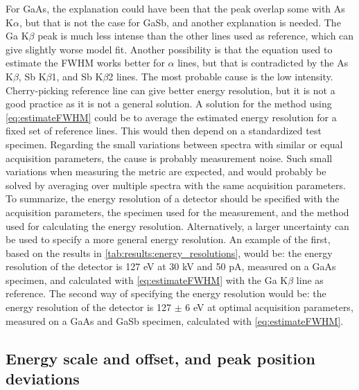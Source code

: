 For GaAs, the explanation could have been that the peak overlap some with As K$\alpha$, but that is not the case for GaSb, and another explanation is needed.
The Ga K$\beta$ peak is much less intense than the other lines used as reference, which can give slightly worse model fit.
Another possibility is that the equation used to estimate the FWHM works better for $\alpha$ lines, but that is contradicted by the As K$\beta$, Sb K$\beta$1, and Sb K$\beta$2 lines.
The most probable cause is the low intensity.
Cherry-picking reference line can give better energy resolution, but it is not a good practice as it is not a general solution.
A solution for the method using \cref{eq:estimateFWHM} could be to average the estimated energy resolution for a fixed set of reference lines.
This would then depend on a standardized test specimen.
Regarding the small variations between spectra with similar or equal acquisition parameters, the cause is probably measurement noise.
Such small variations when measuring the metric are expected, and would probably be solved by averaging over multiple spectra with the same acquisition parameters.
To summarize, the energy resolution of a detector should be specified with the acquisition parameters, the specimen used for the measurement, and the method used for calculating the energy resolution.
Alternatively, a larger uncertainty can be used to specify a more general energy resolution.
An example of the first, based on the results in \cref{tab:results:energy_resolutions}, would be:  the energy resolution of the detector is 127 eV at 30 kV and 50 pA, measured on a GaAs specimen, and calculated with \cref{eq:estimateFWHM} with the Ga K$\beta$ line as reference.
The second way of specifying the energy resolution would be: the energy resolution of the detector is 127 $\pm$ 6 eV at optimal acquisition parameters, measured on a GaAs and GaSb specimen, calculated with \cref{eq:estimateFWHM}.



\subsection{Energy scale and offset, and peak position deviations}
\label{discussion:scale_offset}

